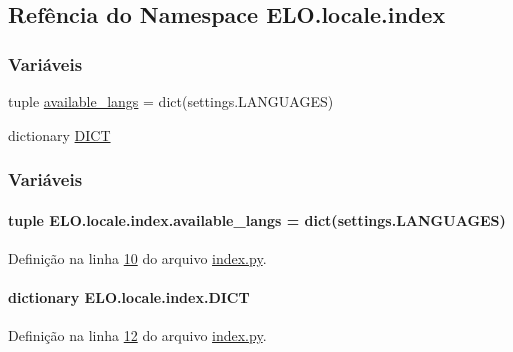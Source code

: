 \hypertarget{namespaceELO_1_1locale_1_1index}{\subsection{Refência do Namespace E\-L\-O.\-locale.\-index}
\label{namespaceELO_1_1locale_1_1index}
}
\subsubsection*{Variáveis}
\begin{DoxyCompactItemize}
\item 
tuple \hyperlink{namespaceELO_1_1locale_1_1index_ab62adb4738ab68b1693adb90951d92a9}{available\-\_\-langs} = dict(settings.\-L\-A\-N\-G\-U\-A\-G\-E\-S)
\item 
dictionary \hyperlink{namespaceELO_1_1locale_1_1index_a065d26641ba89f86fe642e3858607087}{D\-I\-C\-T}
\end{DoxyCompactItemize}


\subsubsection{Variáveis}
\hypertarget{namespaceELO_1_1locale_1_1index_ab62adb4738ab68b1693adb90951d92a9}{
\paragraph[{available\-\_\-langs}]{\setlength{\rightskip}{0pt plus 5cm}tuple E\-L\-O.\-locale.\-index.\-available\-\_\-langs = dict(settings.\-L\-A\-N\-G\-U\-A\-G\-E\-S)}}\label{namespaceELO_1_1locale_1_1index_ab62adb4738ab68b1693adb90951d92a9}


Definição na linha \hyperlink{locale_2index_8py_source_l00010}{10} do arquivo \hyperlink{locale_2index_8py_source}{index.\-py}.

\hypertarget{namespaceELO_1_1locale_1_1index_a065d26641ba89f86fe642e3858607087}{
\paragraph[{D\-I\-C\-T}]{\setlength{\rightskip}{0pt plus 5cm}dictionary E\-L\-O.\-locale.\-index.\-D\-I\-C\-T}}\label{namespaceELO_1_1locale_1_1index_a065d26641ba89f86fe642e3858607087}


Definição na linha \hyperlink{locale_2index_8py_source_l00012}{12} do arquivo \hyperlink{locale_2index_8py_source}{index.\-py}.

